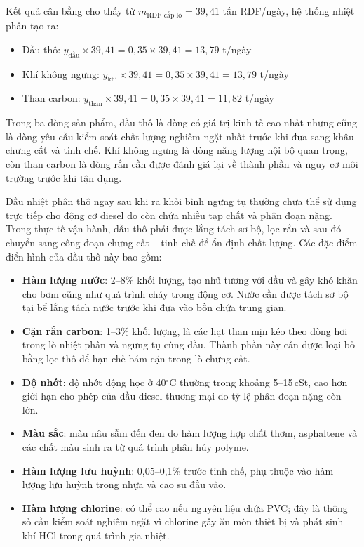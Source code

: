 \documentclass[../main.tex]{subfiles}
\begin{document}
Kết quả cân bằng cho thấy từ $m_{\text{RDF cấp lò}} = 39{,}41$ tấn RDF/ngày, hệ thống nhiệt phân tạo ra:
\begin{itemize}
  \item Dầu thô: $y_{\text{dầu}} \times 39{,}41 = 0{,}35 \times 39{,}41 = 13{,}79$ t/ngày
  \item Khí không ngưng: $y_{\text{khí}} \times 39{,}41 = 0{,}35 \times 39{,}41 = 13{,}79$ t/ngày
  \item Than carbon: $y_{\text{than}} \times 39{,}41 = 0{,}35 \times 39{,}41 = 11{,}82$ t/ngày
\end{itemize}

Trong ba dòng sản phẩm, dầu thô là dòng có giá trị kinh tế cao nhất nhưng cũng là dòng yêu cầu kiểm soát chất lượng nghiêm ngặt nhất trước khi đưa sang khâu chưng cất và tinh chế. Khí không ngưng là dòng năng lượng nội bộ quan trọng, còn than carbon là dòng rắn cần được đánh giá lại về thành phần và nguy cơ môi trường trước khi tận dụng.

Dầu nhiệt phân thô ngay sau khi ra khỏi bình ngưng tụ thường chưa thể sử dụng trực tiếp cho động cơ diesel do còn chứa nhiều tạp chất và phân đoạn nặng. Trong thực tế vận hành, dầu thô phải được lắng tách sơ bộ, lọc rắn và sau đó chuyển sang công đoạn chưng cất -- tinh chế để ổn định chất lượng. Các đặc điểm điển hình của dầu thô này bao gồm:

\begin{itemize}
  \item \textbf{Hàm lượng nước}: 2--8\% khối lượng, tạo nhũ tương với dầu và gây khó khăn cho bơm cũng như quá trình cháy trong động cơ. Nước cần được tách sơ bộ tại bể lắng tách nước trước khi đưa vào bồn chứa trung gian.
  \item \textbf{Cặn rắn carbon}: 1--3\% khối lượng, là các hạt than mịn kéo theo dòng hơi trong lò nhiệt phân và ngưng tụ cùng dầu. Thành phần này cần được loại bỏ bằng lọc thô để hạn chế bám cặn trong lò chưng cất.
  \item \textbf{Độ nhớt}: độ nhớt động học ở 40$^\circ\mathrm{C}$ thường trong khoảng 5--15\,cSt, cao hơn giới hạn cho phép của dầu diesel thương mại do tỷ lệ phân đoạn nặng còn lớn.
  \item \textbf{Màu sắc}: màu nâu sẫm đến đen do hàm lượng hợp chất thơm, asphaltene và các chất màu sinh ra từ quá trình phân hủy polyme.
  \item \textbf{Hàm lượng lưu huỳnh}: 0,05--0,1\% trước tinh chế, phụ thuộc vào hàm lượng lưu huỳnh trong nhựa và cao su đầu vào.
  \item \textbf{Hàm lượng chlorine}: có thể cao nếu nguyên liệu chứa PVC; đây là thông số cần kiểm soát nghiêm ngặt vì chlorine gây ăn mòn thiết bị và phát sinh khí HCl trong quá trình gia nhiệt.
\end{itemize}
\end{document}
